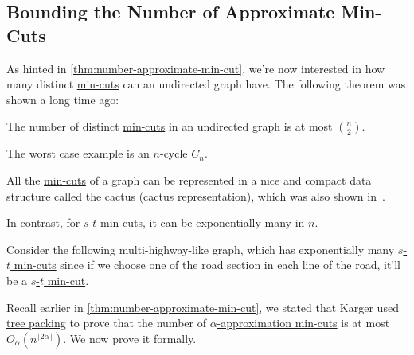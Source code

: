 \subsection{Bounding the Number of Approximate Min-Cuts}
As hinted in \autoref{thm:number-approximate-min-cut}, we're now interested in how many distinct \hyperref[prb:global-min-cut]{min-cuts} can an undirected graph have. The following theorem was shown a long time ago:

\begin{theorem}
	The number of distinct \hyperref[prb:global-min-cut]{min-cuts} in an undirected graph is at most \(\binom{n}{2}\).
\end{theorem}

\begin{eg}[Cycle]
	The worst case example is an \(n\)-cycle \(C_n\).
\end{eg}

\begin{remark}
	All the \hyperref[prb:global-min-cut]{min-cuts} of a graph can be represented in a nice and compact data structure called the cactus (cactus representation), which was also shown in~\cite{dinitz1976structure}.
\end{remark}

In contrast, for \hyperref[prb:s-t-min-cut]{\(s\)-\(t\) min-cuts}, it can be exponentially many in \(n\).

\begin{eg}
	Consider the following multi-highway-like graph, which has exponentially many \hyperref[prb:s-t-min-cut]{\(s\)-\(t\) min-cuts} since if we choose one of the road section in each line of the road, it'll be a \hyperref[prb:s-t-min-cut]{\(s\)-\(t\) min-cut}.
	\begin{center}
	\end{center}
\end{eg}

Recall earlier in \autoref{thm:number-approximate-min-cut}, we stated that Karger used \hyperref[prb:tree-packing]{tree packing} to prove that the number of \hyperref[def:approximate-min-cut]{\(\alpha \)-approximation min-cuts} is at most \(O_\alpha (n^{\lfloor 2\alpha \rfloor })\). We now prove it formally.

